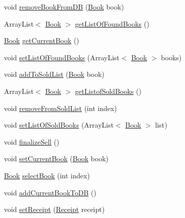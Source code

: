 \begin{DoxyCompactItemize}
\item 
void \hyperlink{classw3se_1_1_model_1_1_i_m_s_a69d545294a981d608d0a737c387af56a}{remove\-Book\-From\-D\-B} (\hyperlink{classw3se_1_1_model_1_1_base_1_1_book}{Book} book)
\item 
Array\-List$<$ \hyperlink{classw3se_1_1_model_1_1_base_1_1_book}{Book} $>$ \hyperlink{classw3se_1_1_model_1_1_i_m_s_a161da51ba85f1a9d6ba295cea7df4af5}{get\-List\-Of\-Found\-Books} ()
\item 
\hyperlink{classw3se_1_1_model_1_1_base_1_1_book}{Book} \hyperlink{classw3se_1_1_model_1_1_i_m_s_ae728453cc1a028cd6e973a66bf137154}{get\-Current\-Book} ()
\item 
void \hyperlink{classw3se_1_1_model_1_1_i_m_s_adeb24923de3df68e1d79a8af464b55ed}{set\-List\-Of\-Found\-Books} (Array\-List$<$ \hyperlink{classw3se_1_1_model_1_1_base_1_1_book}{Book} $>$ books)
\item 
void \hyperlink{classw3se_1_1_model_1_1_i_m_s_abc794cf00b281dcde2dd5650d2a35df3}{add\-To\-Sold\-List} (\hyperlink{classw3se_1_1_model_1_1_base_1_1_book}{Book} book)
\item 
Array\-List$<$ \hyperlink{classw3se_1_1_model_1_1_base_1_1_book}{Book} $>$ \hyperlink{classw3se_1_1_model_1_1_i_m_s_a3fce2e06f8c7fac8c7be788d6a99f444}{get\-Listof\-Sold\-Books} ()
\item 
void \hyperlink{classw3se_1_1_model_1_1_i_m_s_a53f461065b62c96d13ca53fe939d0d36}{remove\-From\-Sold\-List} (int index)
\item 
void \hyperlink{classw3se_1_1_model_1_1_i_m_s_a53ebb58f51581f19bfcce40e407b067d}{set\-List\-Of\-Sold\-Books} (Array\-List$<$ \hyperlink{classw3se_1_1_model_1_1_base_1_1_book}{Book} $>$ list)
\item 
void \hyperlink{classw3se_1_1_model_1_1_i_m_s_a766019bb9abfbd84ecb7af9683fe8cdf}{finalize\-Sell} ()
\item 
void \hyperlink{classw3se_1_1_model_1_1_i_m_s_a33ea6c42c31831ba2ee83dfd74c94aae}{set\-Current\-Book} (\hyperlink{classw3se_1_1_model_1_1_base_1_1_book}{Book} book)
\item 
\hyperlink{classw3se_1_1_model_1_1_base_1_1_book}{Book} \hyperlink{classw3se_1_1_model_1_1_i_m_s_a86b78b42ecdeaee174bdbd2a7fbd15a4}{select\-Book} (int index)
\item 
void \hyperlink{classw3se_1_1_model_1_1_i_m_s_a9b92c4df4626a54d0cde133910be9747}{add\-Current\-Book\-To\-D\-B} ()
\item 
void \hyperlink{classw3se_1_1_model_1_1_i_m_s_a2d6a603188b08eb79ea28e884cc08aba}{set\-Receipt} (\hyperlink{classw3se_1_1_model_1_1_base_1_1_receipt}{Receipt} receipt)

\end{DoxyCompactItemize}
